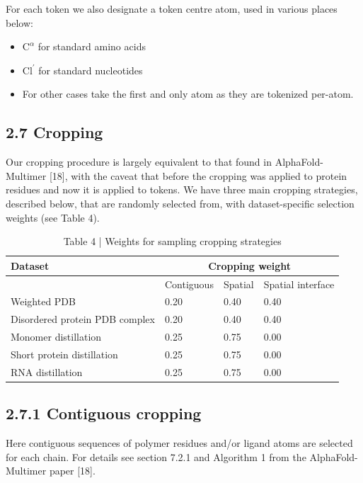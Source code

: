\documentclass[10pt]{article}
\begin{document}
For each token we also designate a token centre atom, used in various places below:

\begin{itemize}
  \item $\mathrm{C}^{\alpha}$ for standard amino acids
  \item $\mathrm{Cl}^{\prime}$ for standard nucleotides
  \item For other cases take the first and only atom as they are tokenized per-atom.
\end{itemize}

\subsection*{2.7 Cropping}
Our cropping procedure is largely equivalent to that found in AlphaFold-Multimer [18], with the caveat that before the cropping was applied to protein residues and now it is applied to tokens. We have three main cropping strategies, described below, that are randomly selected from, with dataset-specific selection weights (see Table 4).

\begin{table}[h]
\begin{center}
\captionsetup{labelformat=empty}
\caption{Table 4 | Weights for sampling cropping strategies}
\begin{tabular}{|l|l|l|l|}
\hline
\multirow[t]{2}{*}{Dataset} & \multicolumn{3}{|c|}{Cropping weight} \\
\hline
 & Contiguous & Spatial & Spatial interface \\
\hline
Weighted PDB & 0.20 & 0.40 & 0.40 \\
\hline
Disordered protein PDB complex & 0.20 & 0.40 & 0.40 \\
\hline
Monomer distillation & 0.25 & 0.75 & 0.00 \\
\hline
Short protein distillation & 0.25 & 0.75 & 0.00 \\
\hline
RNA distillation & 0.25 & 0.75 & 0.00 \\
\hline
\end{tabular}
\end{center}
\end{table}

\subsection*{2.7.1 Contiguous cropping}
Here contiguous sequences of polymer residues and/or ligand atoms are selected for each chain. For details see section 7.2.1 and Algorithm 1 from the AlphaFold-Multimer paper [18].
\end{document}
